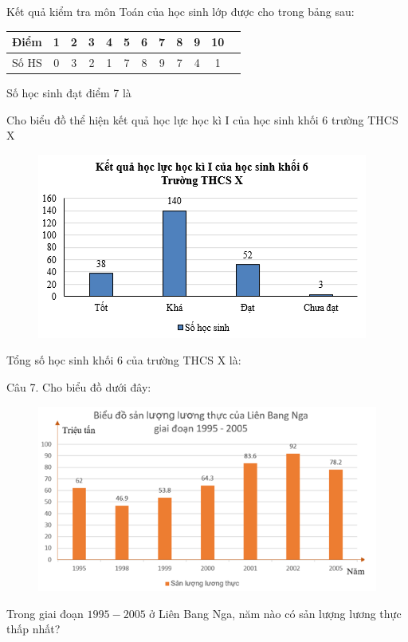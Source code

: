 \begin{ex}
	Kết quả kiểm tra môn Toán của học sinh lớp   được cho trong bảng sau:
	\begin{center}
		\begin{tabular}{|l|c|c|c|c|c|c|c|c|c|c|c|}
			\hline
			Điểm & 1&2&3&4&5&6&7&8&9&10\\
			\hline
			Số HS &0&3&2&1&7&8&9&7&4&1\\
			\hline
		\end{tabular}
	\end{center}
	Số học sinh đạt điểm 7 là
\end{ex}
\begin{ex}
	Cho biểu đồ thể hiện kết quả học lực học kì I của học sinh khối 6 trường THCS X
	\begin{figure}[H]
		\centering
		\vspace*{-5pt}
		\captionsetup{labelformat= empty, justification=centering}
		\includegraphics[width=0.5\linewidth]{18}
		\vspace*{-10pt}
	\end{figure}
	Tổng số học sinh khối 6 của trường THCS X là: 
\end{ex}
\begin{ex}
	Câu 7. Cho biểu đồ dưới đây:
	\begin{figure}[H]
		\centering
		\vspace*{-5pt}
		\captionsetup{labelformat= empty, justification=centering}
		\includegraphics[width=0.5\linewidth]{19}
		\vspace*{-10pt}
	\end{figure}
	Trong giai đoạn $1995-2005$ ở Liên Bang Nga, năm nào có sản lượng lương thực thấp nhất?
\end{ex}
